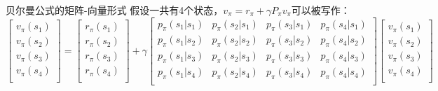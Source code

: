 \begin{frame}{贝尔曼公式的矩阵-向量形式}
    假设一共有4个状态，$v_\pi=r_\pi+\gamma P_\pi v_\pi$可以被写作：
    \[
       \begin{bmatrix}
            v_\pi(s_1) \\
            v_\pi(s_2) \\
            v_\pi(s_3) \\
            v_\pi(s_4) \\
        \end{bmatrix}
        =
        \begin{bmatrix}
            r_\pi(s_1) \\
            r_\pi(s_2) \\
            r_\pi(s_3) \\
            r_\pi(s_4) \\
        \end{bmatrix}
        +
        \gamma
        \begin{bmatrix}
            p_\pi(s_1|s_1) & p_\pi(s_2|s_1) & p_\pi(s_3|s_1) & p_\pi(s_4|s_1) \\
            p_\pi(s_1|s_2) & p_\pi(s_2|s_2) & p_\pi(s_3|s_2) & p_\pi(s_4|s_2) \\
            p_\pi(s_1|s_3) & p_\pi(s_2|s_3) & p_\pi(s_3|s_3) & p_\pi(s_4|s_3) \\
            p_\pi(s_1|s_4) & p_\pi(s_2|s_4) & p_\pi(s_3|s_4) & p_\pi(s_4|s_4) \\
        \end{bmatrix}
        \begin{bmatrix}
            v_\pi(s_1) \\
            v_\pi(s_2) \\
            v_\pi(s_3) \\
            v_\pi(s_4) \\
        \end{bmatrix}
    \]
    \begin{center}
\end{center}
\end{frame}
